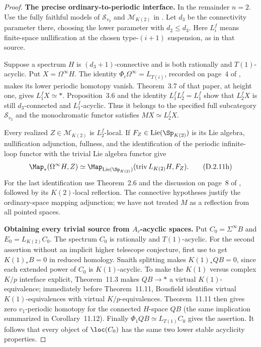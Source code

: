 \begin{proof}
\medskip\noindent
\textbf{The precise ordinary-to-periodic interface.}
In the remainder $n=2$. Use the fully faithful models of
$\mathcal S_{v_2}$ and $\mathcal M_{K(2)}$ in
\cite[Definition~3.11, Corollary~2.8 and Proposition~4.26]
{I_Heuts2021}. Let $d_3$ be the connectivity parameter there,
choosing the lower parameter with $d_2\leq d_3$.
Here $L_i^f$ means finite-space nullification at the chosen
type-$(i+1)$ suspension, as in that source.

Suppose a spectrum $H$ is $(d_3+1)$-connective and is both
rationally and $T(1)$-acyclic. Put $X=\Omega^\infty H$.
The identity $\Phi_i\Omega^\infty=L_{T(i)}$, recorded on
page~4 of \citet{I_Heuts2021}, makes its lower periodic
homotopy vanish. Theorem~3.7 of that paper, at height one,
gives $L_1^fX\simeq *$. Proposition~3.6 and the identity
$L_1^fL_2^f=L_1^f$ show that $L_2^fX$ is still
$d_3$-connected and $L_1^f$-acyclic. Thus it belongs to the
specified full subcategory $\mathcal S_{v_2}$ and the
monochromatic functor satisfies $MX\simeq L_2^fX$.

Every realized $Z\in\mathcal M_{K(2)}$ is $L_2^f$-local.
If $F_Z\in\operatorname{Lie}(\Sp_{K(2)})$ is its Lie
algebra, nullification adjunction, fullness, and the
identification of the periodic infinite-loop functor with
the trivial Lie algebra functor give
\[
 \Map_*(\Omega^\infty H,Z)
 \simeq
 \Map_{\operatorname{Lie}(\Sp_{K(2)})}
       (\operatorname{triv}L_{K(2)}H,F_Z).
 \tag{D.2.11h}
\]
For the last identification use Theorem~2.6 and the discussion
on page~8 of \citet{I_Heuts2021}, followed by its
$K(2)$-local reflection. The connective hypotheses justify
the ordinary-space mapping adjunction; we have not treated
$M$ as a reflection from all pointed spaces.

\medskip\noindent
\textbf{Obtaining every trivial source from $A_r$-acyclic spaces.}
Put $C_0=\Sigma^\infty B$ and $E_0=L_{K(2)}C_0$.
The spectrum $C_0$ is rationally and $T(1)$-acyclic. For
the second assertion without an implicit higher telescope
conjecture, first use
\cite[Section~10.11]{EH5Bousfield1997} to get
$K(1)_*B=0$ in reduced homology. Snaith splitting makes
$K(1)_*QB=0$, since each extended power of $C_0$ is
$K(1)$-acyclic. To make the $K(1)$ versus complex $K/p$
interface explicit, Theorem~11.3 makes $QB\to *$ a virtual
$K(1)$-equivalence; immediately before Theorem~11.11,
Bousfield identifies virtual $K(1)$-equivalences with virtual
$K/p$-equivalences. Theorem~11.11 then gives zero
$v_1$-periodic homotopy for the connected $H$-space $QB$
(the same implication summarized in Corollary~11.12).
Finally $\Phi_1QB\simeq L_{T(1)}C_0$ gives the assertion.
It follows that every object of $\loc(C_0)$ has the same
two lower stable acyclicity properties.


\end{proof}
